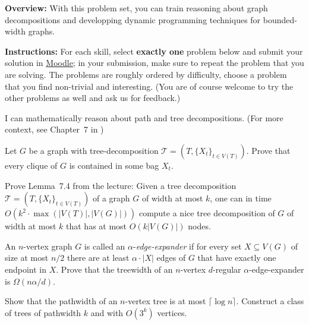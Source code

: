 \documentclass{uebung_cs}
\begin{document}
\textbf{Overview:} With this problem set, you can train reasoning about graph decompositions and developping dynamic programming techniques for bounded-width graphs.

\textbf{Instructions:} For each skill, select \textbf{exactly one} problem below and submit your solution in \href{https://moodle.studiumdigitale.uni-frankfurt.de/moodle/course/view.php?id=6259}{Moodle}; in your submission, make sure to repeat the problem that you are solving.
The problems are roughly ordered by difficulty, choose a problem that you find non-trivial and interesting. (You are of course welcome to try the other problems as well and ask us for feedback.)

\begin{skill}
  I can mathematically reason about path and tree decompositions. \normalfont (For more context, see Chapter~7 in \cygan{})
\end{skill}

\begin{exercise}
  Let $G$ be a graph with tree-decomposition $\mathcal{T}=(T,\{X_t\}_{t\in V(T)})$. Prove that every clique of $G$ is contained in some bag $X_t$.
\end{exercise}

\begin{exercise}
  Prove Lemma~7.4 from the lecture:
  {Given a tree decomposition $\mathcal{T}=(T,\{X_t\}_{t\in V(T)})$ of a graph $G$ of width at most $k$, one can in time $O(k^2\cdot \max(|V(T)|,|V(G)|))$ compute a nice tree decomposition of $G$ of width at most $k$ that has at most $O(k|V(G)|)$ nodes.
  }
\end{exercise}

\begin{exercise}
  An $n$-vertex graph $G$ is called an $\alpha$-\emph{edge-expander} if for every set $X \subseteq V(G)$ of size at most $n/2$ there are at least $\alpha\cdot |X|$ edges of $G$ that have exactly one endpoint in $X$. Prove that the treewidth of an $n$-vertex $d$-regular $\alpha$-edge-expander is $\Omega(n\alpha/d)$.
\end{exercise}

\begin{exercise}[Pathwidth][\hard]
  Show that the pathwidth of an $n$-vertex tree is at most $\lceil \log n \rceil$. Construct a class of trees of pathwidth $k$ and with $O(3^k)$ vertices.
\end{exercise}
\end{document}
